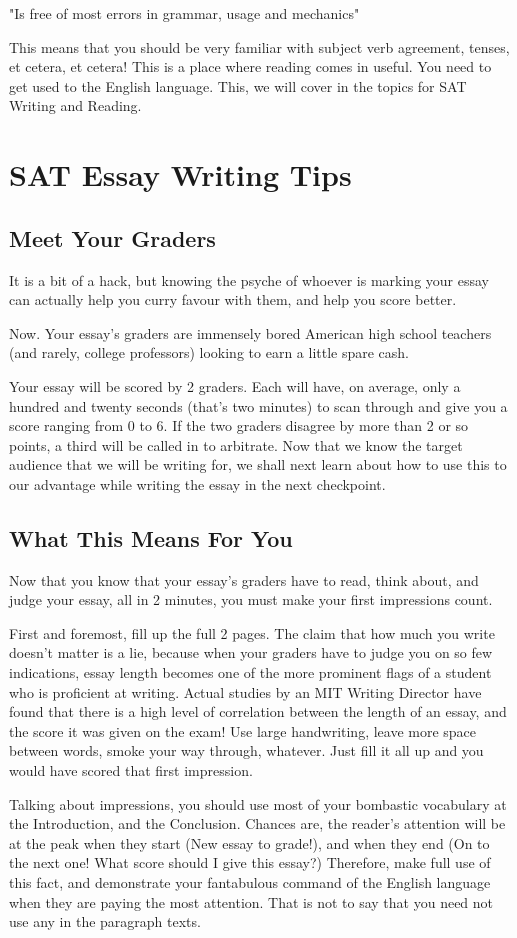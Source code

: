 "Is free of most errors in grammar, usage and mechanics"

This means that you should be very familiar with subject verb agreement, tenses, et cetera, et cetera! This is a place where reading comes in useful. You need to get used to the English language. This, we will cover in the topics for SAT Writing and Reading.
\section{SAT Essay Writing Tips}
\subsection{Meet Your Graders}
It is a bit of a hack, but knowing the psyche of whoever is marking your essay can actually help you curry favour with them, and help you score better.

Now. Your essay's graders are immensely bored American high school teachers (and rarely, college professors) looking to earn a little spare cash.

Your essay will be scored by 2 graders. Each will have, on average, only a hundred and twenty seconds (that's two minutes) to scan through and give you a score ranging from 0 to 6. If the two graders disagree by more than 2 or so points, a third will be called in to arbitrate. Now that we know the target audience that we will be writing for, we shall next learn about how to use this to our advantage while writing the essay in the next checkpoint.
\subsection{What This Means For You}
Now that you know that your essay's graders have to read, think about, and judge your essay, all in 2 minutes, you must make your first impressions count.

First and foremost, fill up the full 2 pages. The claim that how much you write doesn't matter is a lie, because when your graders have to judge you on so few indications, essay length becomes one of the more prominent flags of a student who is proficient at writing. Actual studies by an MIT Writing Director have found that there is a high level of correlation between the length of an essay, and the score it was given on the exam! Use large handwriting, leave more space between words, smoke your way through, whatever. Just fill it all up and you would have scored that first impression.

Talking about impressions, you should use most of your bombastic vocabulary at the Introduction, and the Conclusion. Chances are, the reader's attention will be at the peak when they start (New essay to grade!), and when they end (On to the next one! What score should I give this essay?) Therefore, make full use of this fact, and demonstrate your fantabulous command of the English language when they are paying the most attention. That is not to say that you need not use any in the paragraph texts.

